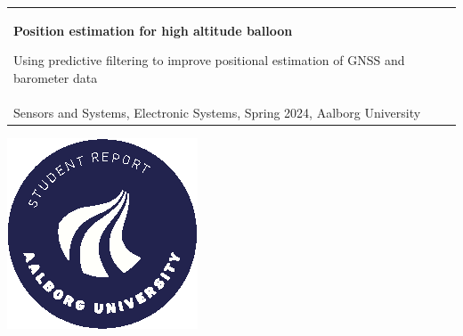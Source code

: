 %
\begin{titlepage}
\vspace*{\fill}
  \addtolength{\hoffset}{0.5\evensidemargin-0.5\oddsidemargin} %
  \noindent%
  {\color{white}\colorbox{aaublue}{\begin{tabular}{@{}p{\textwidth}@{}}
    \begin{center}
    \Huge{\textbf{
      Position estimation for high altitude balloon%
    }}
    \end{center}
    \begin{center}
      \Large{
        Using predictive filtering to improve positional estimation of GNSS and barometer data%
      }
    \end{center}
    \vspace{0.2cm}
   \begin{center}
    {\Large
    Jens Moeslund Larsen \& Albert Werner Laursen%
    }\\
    \vspace{0.2cm}
    {\large
      Sensors and Systems, Electronic Systems, Spring 2024, Aalborg University%
    }
   \end{center}
   \vspace{0.2cm}
   \begin{center}
    {\Large
        Miniproject
    }
   \end{center}
  \end{tabular}}}
  \vfill
  \begin{center}
    \includegraphics[width=0.2\paperwidth]{chapters/00Frontmatter/figures/aau_logo_circle_en}%
  \end{center}
\end{titlepage}
\clearpage
{}